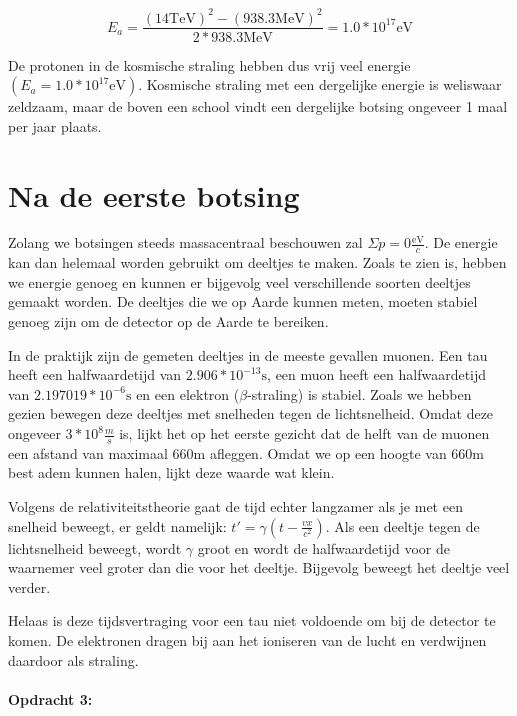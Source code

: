\begin{equation}
E_{a}=\frac{\left(14\mathrm{TeV}\right)^{2}-\left(938.3\mathrm{MeV}\right)^{2}}{2*938.3\mathrm{MeV}}
=1.0*10^{17}\mathrm{eV}
\end{equation}


De protonen in de kosmische straling hebben dus vrij veel energie
$\left(E_{a}=1.0*10^{17}\mathrm{eV}\right)$. Kosmische straling met
een dergelijke energie is weliswaar zeldzaam, maar de boven een school
vindt een dergelijke botsing ongeveer 1 maal per jaar plaats.


\section{Na de eerste botsing}

Zolang we botsingen steeds massacentraal beschouwen zal $\Sigma p=0\frac{\mathrm{eV}}{c}$.
De energie kan dan helemaal worden gebruikt om deeltjes te maken.
Zoals te zien is, hebben we energie genoeg en kunnen er bijgevolg
veel verschillende soorten deeltjes gemaakt worden. De deeltjes die
we op Aarde kunnen meten, moeten stabiel genoeg zijn om de detector
op de Aarde te bereiken.

In de praktijk zijn de gemeten deeltjes in de meeste gevallen muonen.
Een tau heeft een halfwaardetijd van $2.906*10^{-13}\mathrm{s}$,
een muon heeft een halfwaardetijd van $2.197019*10^{-6}\mathrm{s}$
en een elektron ($\beta$-straling) is stabiel. Zoals we hebben gezien
bewegen deze deeltjes met snelheden tegen de lichtsnelheid. Omdat
deze ongeveer $3*10^{8}\frac{m}{s}$ is, lijkt het op het eerste gezicht
dat de helft van de muonen een afstand van maximaal 660m afleggen.
Omdat we op een hoogte van 660m best adem kunnen halen, lijkt deze
waarde wat klein.

Volgens de relativiteitstheorie gaat de tijd echter langzamer als
je met een snelheid beweegt, er geldt namelijk: $t'=\gamma\left(t-\frac{vx}{c^{2}}\right)$.
Als een deeltje tegen de lichtsnelheid beweegt, wordt $\gamma$ groot
en wordt de halfwaardetijd voor de waarnemer veel groter dan die voor
het deeltje. Bijgevolg beweegt het deeltje veel verder.

Helaas is deze tijdsvertraging voor een tau niet voldoende om bij
de detector te komen. De elektronen dragen bij aan het ioniseren van
de lucht en verdwijnen daardoor als straling. 


\paragraph*{Opdracht 3:}

